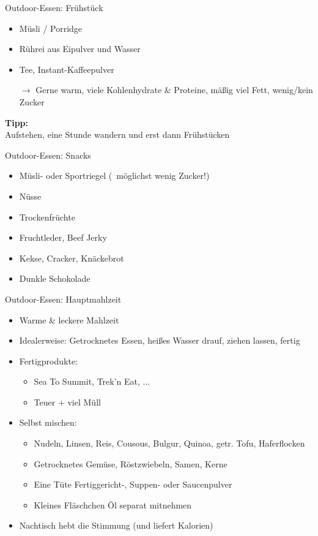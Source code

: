 \documentclass{beamer}
\newcommand{\sarrow}{\small$\rightarrow$}
\newcommand{\tipp}[2][Tipp]{\vspace{0.2cm}\textbf{#1:}\\#2}
\begin{document}
			\begin{frame}{Outdoor-Essen: Frühstück}
				\begin{itemize}
					\item Müsli / Porridge
					\item Rührei aus Eipulver und Wasser
					\item Tee, Instant-Kaffeepulver
					\item[\sarrow] Gerne warm, viele Kohlenhydrate \& Proteine, mäßig viel Fett, wenig/kein Zucker
				\end{itemize}\pause
				\tipp{Aufstehen, eine Stunde wandern und erst dann Frühstücken}\\\pause
			\end{frame}
			
			\begin{frame}{Outdoor-Essen: Snacks}
				\begin{itemize}
					\item Müsli- oder Sportriegel (\textrightarrow\ möglichst wenig Zucker!)
					\item Nüsse
					\item Trockenfrüchte
					\item Fruchtleder, Beef Jerky
					\item Kekse, Cracker, Knäckebrot
					\item Dunkle Schokolade
				\end{itemize}
			\end{frame}
			
			\begin{frame}{Outdoor-Essen: Hauptmahlzeit}
				\begin{itemize}
					\item Warme \& leckere Mahlzeit
					\item Idealerweise: Getrocknetes Essen, heißes Wasser drauf, ziehen lassen, fertig\pause
					\item Fertigprodukte:
					\begin{itemize}
						\item Sea To Summit, Trek'n Eat, ...
						\item Teuer + viel Müll
					\end{itemize}\pause
					\item Selbst mischen:
					\begin{itemize}
						\item Nudeln, Linsen, Reis, Cousous, Bulgur, Quinoa, getr. Tofu, Haferflocken
						\item Getrocknetes Gemüse, Röstzwiebeln, Samen, Kerne
						\item Eine Tüte Fertiggericht-, Suppen- oder Saucenpulver
						\item Kleines Fläschchen Öl separat mitnehmen
					\end{itemize}
					\item Nachtisch hebt die Stimmung (und liefert Kalorien)
				\end{itemize}
			\end{frame}
			
\end{document}
